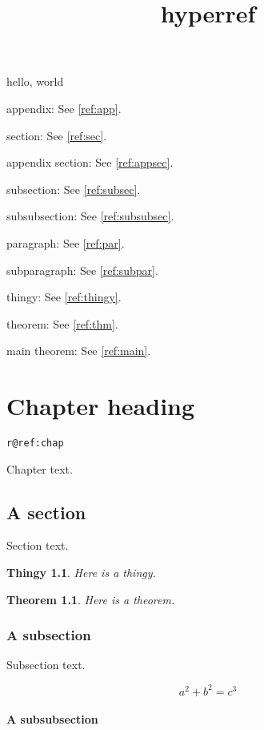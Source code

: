 \documentclass{amsbook}
\title{hyperref}
\newtheorem{x}{Thingy}
\newtheorem{thm}{Theorem}
\begin{document}
hello, world


appendix: See \autoref{ref:app}.

section: See \autoref{ref:sec}.

appendix section: See \autoref{ref:appsec}.

subsection: See \autoref{ref:subsec}.

subsubsection: See \autoref{ref:subsubsec}.

paragraph: See \autoref{ref:par}.

subparagraph: See \autoref{ref:subpar}.

thingy: See \autoref{ref:thingy}.

theorem: See \autoref{ref:thm}.

main theorem: See \autoref{ref:main}.

\newpage

\chapter{Chapter heading}
\label{ref:chap}

{\tt\expandafter\meaning\csname r@ref:chap\endcsname}

Chapter text.

\section{A section}
\label{ref:sec}

Section text.

\begin{x}\label{ref:thingy}
Here is a thingy.
\end{x}

\begin{thm}\label{ref:thm}
Here is a theorem.
\end{thm}

\subsection{A subsection}
\label{ref:subsec}

Subsection text.

\begin{equation}\label{ref:equation}
a^2 + b^2 = c^3
\end{equation}

\subsubsection{A subsubsection}
\label{ref:subsubsec}
\end{document}
